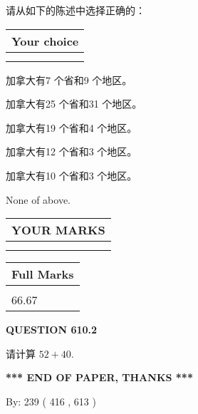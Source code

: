 \documentclass{ctexart}
\begin{document}
  
请从如下的陈述中选择正确的：
  
  
\noindent\hspace{3.0in} \begin{tabular}{|l|}
\hline
Your choice \\
\hline
 \\ 
 \\ 
\hline
\end{tabular}
  
  
 
 
加拿大有7 个省和9 个地区。
 
 
加拿大有25 个省和31 个地区。
 
 
加拿大有19 个省和4 个地区。
 
 
加拿大有12 个省和3 个地区。
 
 
加拿大有10 个省和3 个地区。
 
 
 None of above.
 
 
  
\vspace{0.2in}
  
\noindent\begin{tabular}{|l|}
\hline
 YOUR MARKS  \\
\hline
 \\ 
 \\ 
\hline
\end{tabular}
\hspace{0.05in} \begin{tabular}{|l|}
\hline
 Full Marks  \\
\hline
 \\ 
66.67 \\
\hline
\end{tabular}
{\textbf{\Large{QUESTION
610.2 
}}}
  
  
 
请计算 $ %
52 +  %
40 $.
 

 

 
   
   
 \vspace{0.2in}
 
   
   
   
   
\vspace{1.0in} 
{\textbf{\large{ *** END OF PAPER, THANKS *** }}} 
   
   
\hspace{1.0in} By: 
 239 ( 416 ,  613 )
   
\end{document}
